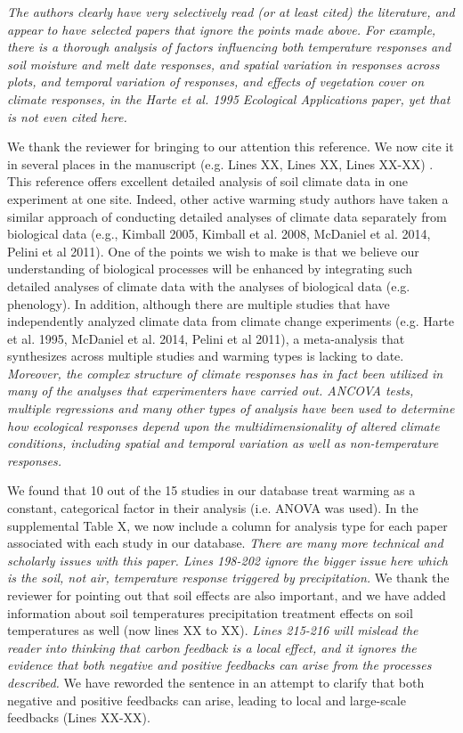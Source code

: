 \documentclass[11pt,a4paper]{letter}
\begin{document}
\begin{letter}{}
\emph{The authors clearly have very selectively read (or at least cited) the literature,  and appear to have selected papers that ignore the points made above.  For example, there is a  thorough analysis of factors influencing both temperature responses and soil moisture and melt date responses, and spatial variation in responses across plots,  and temporal variation of responses, and effects of vegetation cover on climate responses, in the Harte et al. 1995 Ecological Applications paper, yet that is not even cited here.}

We thank the reviewer for bringing to our attention this reference. We now cite it in several places in the manuscript (e.g. Lines XX, Lines XX, Lines XX-XX) . This reference offers excellent detailed analysis of soil climate data in one experiment at one site. Indeed, other active warming study authors have taken a similar approach of conducting detailed analyses of climate data separately from biological data (e.g., Kimball 2005, Kimball et al. 2008, McDaniel et al. 2014, Pelini et al 2011). One of the points we wish to make is that we believe our understanding of biological processes will be enhanced by integrating such detailed analyses of climate data with the analyses of biological data (e.g. phenology). In addition, although there are multiple studies that have independently analyzed climate data from climate change experiments (e.g. Harte et al. 1995, McDaniel et al. 2014, Pelini et al 2011), a meta-analysis that synthesizes across multiple studies and warming types is lacking to date.\\

\emph{Moreover, the complex structure of climate responses has in fact been utilized in many of the analyses that experimenters have carried out.  ANCOVA tests, multiple regressions and many other types of analysis have been used to determine how ecological responses depend upon the multidimensionality of altered climate conditions, including spatial and temporal variation as well as non-temperature responses.}

We found that 10 out of the 15 studies in our database treat warming as a constant, categorical factor in their analysis (i.e. ANOVA was used). In the supplemental Table X,   
we now include a column for analysis type for each paper associated with each study in our database. 
\emph{There are many more technical and scholarly issues with this paper.  Lines 198-202 ignore the bigger issue here which is the soil, not air, temperature response triggered by precipitation.}
We thank the reviewer for pointing out that soil effects are also important, and we have added information about soil temperatures precipitation treatment effects on soil temperatures as well (now lines XX to XX).
\emph  {Lines 215-216 will mislead the reader into thinking that carbon feedback is a local effect, and it ignores the evidence that both negative and positive feedbacks can arise from the processes described.}  
We have reworded the sentence in an attempt to clarify that both negative and positive feedbacks can arise, leading to local and large-scale feedbacks (Lines XX-XX).


\end{letter}
\end{document}
